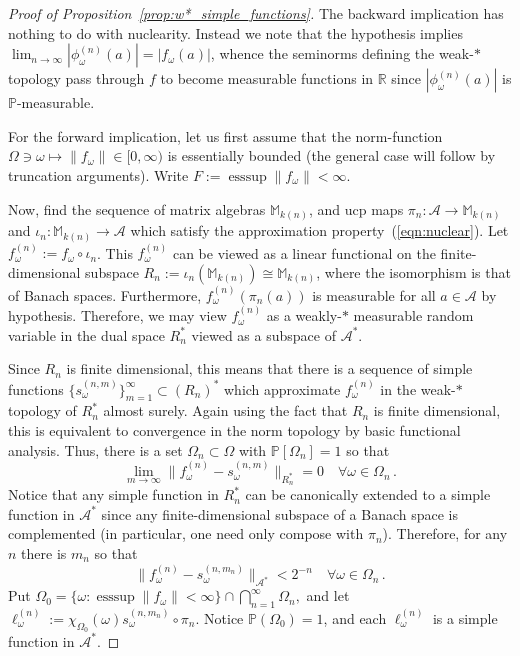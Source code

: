 \documentclass{article}
\DeclareMathOperator*{\esssup}{\mathrm{esssup}}
\newcommand{\A}{\mathcal{A}}
\newcommand{\M}{\mathbb{M}}
\renewcommand{\P}{\mathbb{P}}
\newcommand{\<}{\langle}
\renewcommand{\>}{\rangle}
\theoremstyle{definition}
\numberwithin{equation}{section}
\begin{document}
\begin{proof}[Proof of Proposition~\ref{prop:w*_simple_functions}]
    The backward implication has nothing to do with nuclearity. Instead we note that the hypothesis implies $\lim_{n\to \infty} |\phi^{(n)}_\omega(a)| = |f_\omega(a)|$, whence the seminorms defining the weak-$\ast$ topology pass through $f$ to become measurable functions in $\mathbb{R}$ since $|\phi^{(n)}_\omega(a)|$ is $\P$-measurable.   

    For the forward implication, let us first assume that the norm-function $\Omega \ni \omega \mapsto \|f_\omega\|\in [0, \infty)$ is essentially bounded (the general case will follow by truncation arguments). Write $F:= \esssup \|f_\omega\|<\infty$.  
    
    Now, find the sequence of matrix algebras $\M_{k(n)}$, and ucp maps $\pi_n:\A \to \M_{k(n)}$ and $\iota_n:\M_{k(n)} \to \A$ which satisfy the approximation property~(\ref{eqn:nuclear}). Let $f^{(n)}_\omega := f_\omega \circ \iota_n$. This $f^{(n)}_\omega$ can be viewed as a linear functional on the finite-dimensional subspace $ R_n:= \iota_n(\M_{k(n)}) \cong \M_{k(n)}$, where the isomorphism is that of Banach spaces. Furthermore, $f^{(n)}_\omega(\pi_n(a))$ is measurable for all $a\in \A$ by hypothesis. Therefore, we may view $f^{(n)}_\omega$ as a weakly-$\ast$ measurable random variable in the dual space $R_n^*$ viewed as a subspace of $\A^*$. 
    
    Since $R_n$ is finite dimensional, this means that there is a sequence of simple functions $\{s^{(n,m)}_\omega\}_{m=1}^\infty \subset (R_n)^*$ which approximate $f^{(n)}_\omega$ in the weak-$\ast$ topology of $R_n^*$ almost surely. Again using the fact that $R_n$ is finite dimensional, this is equivalent to convergence in the norm topology by basic functional analysis. Thus, there is a set $\Omega_n\subset \Omega$ with $\P[\Omega _n] =1$ so that
    \begin{equation}
        \lim_{m\to \infty} \|f^{(n)}_\omega - s^{(n,m)}_\omega\|_{R_n^*} = 0\quad \forall\omega \in \Omega_n\,.
    \end{equation} Notice that any simple function in $R_n^*$ can be canonically extended to a simple function in $\A^*$ since any finite-dimensional subspace of a Banach space is complemented \cite[Theorem 4.21(a)]{Rudin} (in particular, one need only compose with $\pi_n$). Therefore, for any $n$ there is $m_n$ so that 
    \[
        \|f^{(n)}_\omega - s^{(n, m_n)}_\omega \|_{\A^*} < 2^{-n}\quad \forall \omega \in \Omega_n\,.
    \] Put $\Omega_0 = \{\omega: \esssup \|f_\omega \| <\infty\} \cap \bigcap_{n=1}^\infty \Omega_n,$ and let $\ell^{(n)}_\omega := \chi_{\Omega_0}(\omega) s^{(n, m_n)}_\omega \circ \pi_n$. Notice $\P(\Omega_0) = 1$, and each $\ell^{(n)}_\omega$ is a simple function in $\A^*$. 


\end{proof}
\end{document}
